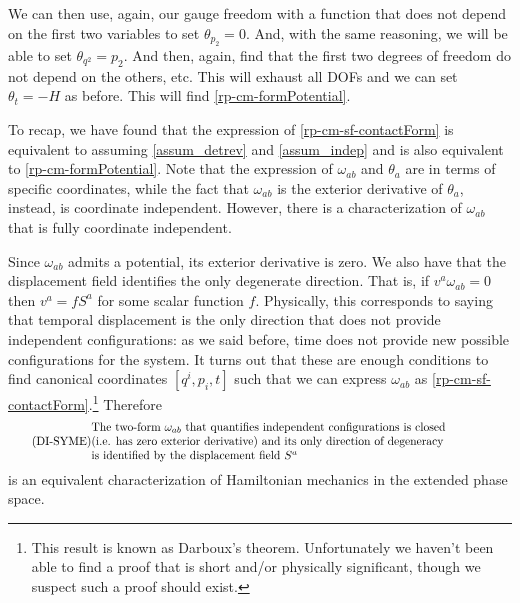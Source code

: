 We can then use, again, our gauge freedom with a function that does not depend on the first two variables to set $\theta_{p_2} = 0$. And, with the same reasoning, we will be able to set $\theta_{q^2} = p_2$. And then, again, find that the first two degrees of freedom do not depend on the others, etc. This will exhaust all DOFs and we can set $\theta_t = -H$ as before. This will find \ref{rp-cm-formPotential}.

To recap, we have found that the expression of \ref{rp-cm-sf-contactForm} is equivalent to assuming \ref{assum_detrev} and \ref{assum_indep} and is also equivalent to \ref{rp-cm-formPotential}. Note that the expression of $\omega_{ab}$ and $\theta_a$ are in terms of specific coordinates, while the fact that $\omega_{ab}$ is the exterior derivative of $\theta_a$, instead, is coordinate independent. However, there is a characterization of $\omega_{ab}$ that is fully coordinate independent.

Since $\omega_{ab}$ admits a potential, its exterior derivative is zero. We also have that the displacement field identifies the only degenerate direction. That is, if $v^a\omega_{ab} = 0$ then $v^a = f S^a$ for some scalar function $f$. Physically, this corresponds to saying that temporal displacement is the only direction that does not provide independent configurations: as we said before, time does not provide new possible configurations for the system. It turns out that these are enough conditions to find canonical coordinates $[ q^i, p_i, t]$ such that we can express $\omega_{ab}$ as \ref{rp-cm-sf-contactForm}.\footnote{This result is known as Darboux's theorem. Unfortunately we haven't been able to find a proof that is short and/or physically significant, though we suspect such a proof should exist.} Therefore
\begin{equation}\label{rp-cm-di-condSymplecticFormDef}
	\tag{DI-SYME}
	\parbox{5in}{The two-form $\omega_{ab}$ that quantifies independent configurations is closed \\ (i.e. has zero exterior derivative)  and its only direction of degeneracy \\ is identified by the displacement field $S^a$}
\end{equation}
is an equivalent characterization of Hamiltonian mechanics in the extended phase space.

